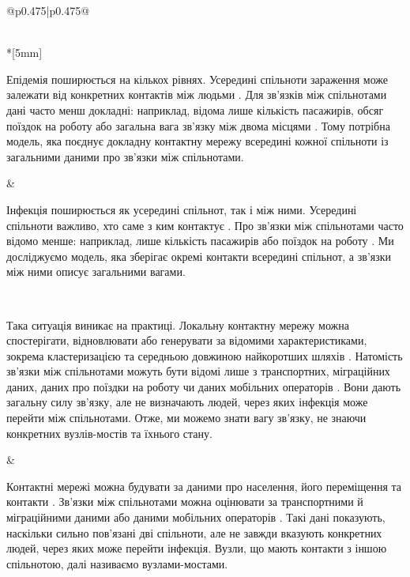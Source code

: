 \documentclass[11pt]{article}
\begin{document}
\begin{longtable}{@{}p{0.475\textwidth}|p{0.475\textwidth}@{}}
\begin{minipage}[t]{\linewidth}
\end{minipage} \\*[5mm]
\begin{minipage}[t]{\linewidth}
Епідемія поширюється на кількох рівнях. Усередині спільноти зараження може залежати від конкретних контактів між людьми \citep{keeling2005,pastorsatorras2015,kiss2017}. Для зв'язків між спільнотами дані часто менш докладні: наприклад, відома лише кількість пасажирів, обсяг поїздок на роботу або загальна вага зв'язку між двома місцями \citep{balcan2009,barbosa2018human}. Тому потрібна модель, яка поєднує докладну контактну мережу всередині кожної спільноти із загальними даними про зв'язки між спільнотами.
\end{minipage} &
\begin{minipage}[t]{\linewidth}
Інфекція поширюється як усередині спільнот, так і між ними. Усередині спільноти важливо, хто саме з ким контактує \citep{keeling2005,pastorsatorras2015,kiss2017}. Про зв'язки між спільнотами часто відомо менше: наприклад, лише кількість пасажирів або поїздок на роботу \citep{balcan2009,barbosa2018human}. Ми досліджуємо модель, яка зберігає окремі контакти всередині спільнот, а зв'язки між ними описує загальними вагами.
\end{minipage} \\[5mm]
\begin{minipage}[t]{\linewidth}
Така ситуація виникає на практиці. Локальну контактну мережу можна спостерігати, відновлювати або генерувати за відомими характеристиками, зокрема кластеризацією та середньою довжиною найкоротших шляхів \citep{eubank2004,danon2011}. Натомість зв'язки між спільнотами можуть бути відомі лише з транспортних, міграційних даних, даних про поїздки на роботу чи даних мобільних операторів \citep{barbosa2018human,chang2021}. Вони дають загальну силу зв'язку, але не визначають людей, через яких інфекція може перейти між спільнотами. Отже, ми можемо знати вагу зв'язку, не знаючи конкретних вузлів-мостів та їхнього стану.
\end{minipage} &
\begin{minipage}[t]{\linewidth}
Контактні мережі можна будувати за даними про населення, його переміщення та контакти \citep{eubank2004,danon2011}. Зв'язки між спільнотами можна оцінювати за транспортними й міграційними даними або даними мобільних операторів \citep{barbosa2018human,chang2021}. Такі дані показують, наскільки сильно пов'язані дві спільноти, але не завжди вказують конкретних людей, через яких може перейти інфекція. Вузли, що мають контакти з іншою спільнотою, далі називаємо вузлами-мостами.

\end{minipage}
\end{longtable}
\end{document}
